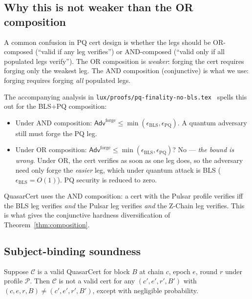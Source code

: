 \subsection{Why this is not weaker than the OR composition}

A common confusion in PQ cert design is whether the legs should be
OR-composed (``valid if any leg verifies'') or AND-composed (``valid
only if all populated legs verify''). The OR composition is
\emph{weaker}: forging the cert requires forging only the weakest
leg. The AND composition (conjunctive) is what we use: forging
requires forging \emph{all} populated legs.

The accompanying analysis in
\texttt{lux/proofs/pq-finality-no-bls.tex}~\cite{pqfinalitynobls}
spells this out for the BLS+PQ composition:

\begin{itemize}[leftmargin=2em,nosep]
\item Under AND composition: $\mathsf{Adv}^{\mathrm{forge}} \leq
      \min(\epsilon_{\mathrm{BLS}}, \epsilon_{\mathrm{PQ}})$. A quantum
      adversary still must forge the PQ leg.
\item Under OR composition: $\mathsf{Adv}^{\mathrm{forge}} \leq
      \min(\epsilon_{\mathrm{BLS}}, \epsilon_{\mathrm{PQ}})$? No ---
      \emph{the bound is wrong}. Under OR, the cert verifies as soon
      as one leg does, so the adversary need only forge the
      \emph{easier} leg, which under quantum attack is BLS
      ($\epsilon_{\mathrm{BLS}} = O(1)$). PQ security is reduced to
      zero.
\end{itemize}

QuasarCert uses the AND composition: a cert with the Pulsar profile
verifies iff the BLS leg verifies \emph{and} the Pulsar leg verifies
\emph{and} the Z-Chain leg verifies. This is what gives the
conjunctive hardness diversification of Theorem~\ref{thm:composition}.

\subsection{Subject-binding soundness}

\begin{theorem}
\label{thm:subject-binding}
Suppose $\mathcal{C}$ is a valid QuasarCert for block $B$ at chain $c$,
epoch $e$, round $r$ under profile $\mathcal{P}$. Then $\mathcal{C}$
is not a valid cert for any $(c', e', r', B')$ with $(c, e, r, B)
\neq (c', e', r', B')$, except with negligible probability.
\end{theorem}

